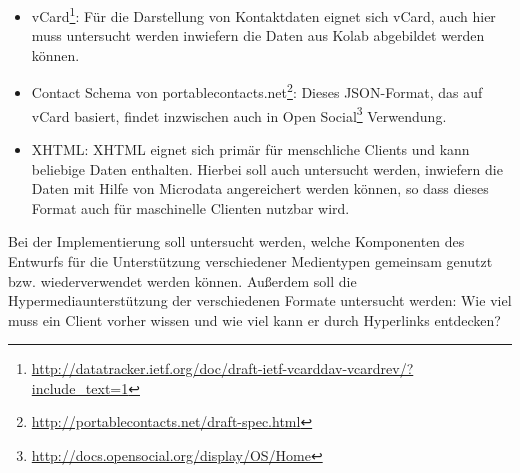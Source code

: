 \documentclass[11pt,a4paper,headsepline,twoside]{scrartcl}		%
\begin{document}
\begin{itemize}
\item
  vCard\footnote{\url{http://datatracker.ietf.org/doc/draft-ietf-vcarddav-vcardrev/?include_text=1}}:
  Für die Darstellung von Kontaktdaten eignet sich vCard, auch hier muss
  untersucht werden inwiefern die Daten aus Kolab abgebildet werden können.
\item Contact Schema von
  portablecontacts.net\footnote{\url{http://portablecontacts.net/draft-spec.html}}:
  Dieses JSON-Format, das auf vCard basiert, findet inzwischen auch in Open
  Social\footnote{\url{http://docs.opensocial.org/display/OS/Home}} Verwendung.
\item XHTML: XHTML eignet sich primär für menschliche Clients und kann beliebige
  Daten enthalten. Hierbei soll auch untersucht werden, inwiefern die Daten mit
  Hilfe von Microdata angereichert werden können, so dass dieses Format auch für
  maschinelle Clienten nutzbar wird.
\end{itemize}

Bei der Implementierung soll untersucht werden, welche Komponenten des Entwurfs
für die Unterstützung verschiedener Medientypen gemeinsam genutzt
bzw. wiederverwendet werden können. Außerdem soll die Hypermediaunterstützung
der verschiedenen Formate untersucht werden: Wie viel muss ein Client vorher
wissen und wie viel kann er durch Hyperlinks entdecken?



\end{document}
